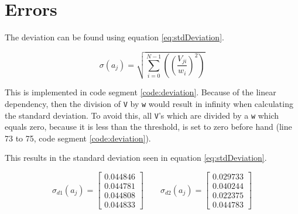 \section{Errors}
The deviation can be found using equation \ref{eq:stdDeviation}.

\begin{equation}
\sigma\left(a_j\right) = \sqrt{ \sum_{i=0}^{N-1} \left( \left( \frac{V_{ji}}{w_i}\right)^2\right) }
\label{eq:stdDeviation}
\end{equation}

This is implemented in code segment \ref{code:deviation}.
Because of the linear dependency, then the division of \texttt{V} by \texttt{w} would result in infinity when calculating the standard deviation.
To avoid this, all \texttt{V}'s which are divided by a \texttt{w} which equals zero, because it is less than the threshold, is set to zero before hand (line 73 to 75, code segment \ref{code:deviation}).




This results in the standard deviation seen in equation \ref{eq:stdDeviation}.

\begin{equation}
\sigma_{d1}\left(a_j\right) = 
    \left[
        \begin{array}{c}
        0.044846 \\
        0.044781 \\
        0.044808 \\
        0.044833
        \end{array}
    \right]
\qquad
\sigma_{d2}\left(a_j\right) = 
    \left[
        \begin{array}{c}
        0.029733 \\
        0.040244 \\
        0.022375 \\
        0.044783
        \end{array}
    \right]
\label{eq:stdDeviation}
\end{equation}